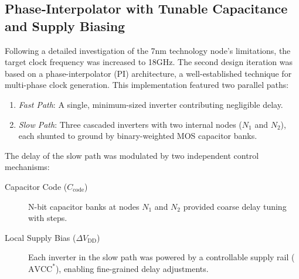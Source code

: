 \subsection{Phase‑Interpolator with Tunable Capacitance and Supply Biasing}\label{sec:pi_cap_supply}

Following a detailed investigation of the 7nm technology node's limitations, the target clock frequency was increased to 18GHz. The second design iteration was based on a phase-interpolator (PI) architecture, a well-established technique for multi-phase clock generation. This implementation featured two parallel paths:

\begin{enumerate}
  \item \emph{Fast Path}: A single, minimum-sized inverter contributing negligible delay.
  \item \emph{Slow Path}: Three cascaded inverters with two internal nodes ($N_1$ and $N_2$), each shunted to ground by binary-weighted MOS capacitor banks.
\end{enumerate}

The delay of the slow path was modulated by two independent control mechanisms:
\begin{description}
  \item[Capacitor Code ($C_\text{code}$)] N-bit capacitor banks at nodes $N_1$ and $N_2$ provided coarse delay tuning with steps.
  \item[Local Supply Bias ($\Delta V_\text{DD}$)] Each inverter in the slow path was powered by a controllable supply rail ($\text{AVCC}^*$), enabling fine-grained delay adjustments.
\end{description}

